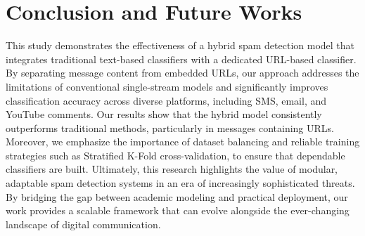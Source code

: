 \documentclass{article}
\begin{document}

\section{Conclusion and Future Works}
This study demonstrates the effectiveness of a hybrid spam detection model that integrates traditional text-based classifiers with a dedicated URL-based classifier. By separating message content from embedded URLs, our approach addresses the limitations of conventional single-stream models and significantly improves classification accuracy across diverse platforms, including SMS, email, and YouTube comments. Our results show that the hybrid model consistently outperforms traditional methods, particularly in messages containing URLs. Moreover, we emphasize the importance of dataset balancing and reliable training strategies such as Stratified K-Fold cross-validation, to ensure that dependable classifiers are built. Ultimately, this research highlights the value of modular, adaptable spam detection systems in an era of increasingly sophisticated threats. By bridging the gap between academic modeling and practical deployment, our work provides a scalable framework that can evolve alongside the ever-changing landscape of digital communication.
\newline
\end{document}
